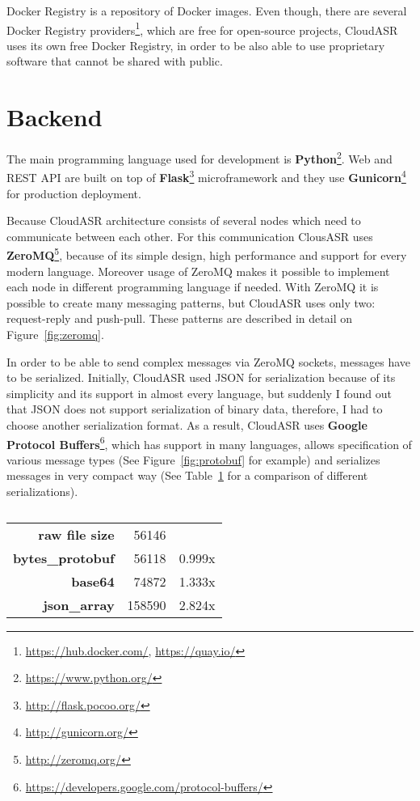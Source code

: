 Docker Registry is a repository of Docker images.
Even though, there are several Docker Registry providers\footnote{\url{https://hub.docker.com/}, \url{https://quay.io/}},
  which are free for open-source projects,
  CloudASR uses its own free Docker Registry,
  in order to be also able to use proprietary software that cannot be shared with public.


\section{Backend}
The main programming language used for development is \textbf{Python}\footnote{\url{https://www.python.org/}}.
Web and REST API are built on top of \textbf{Flask}\footnote{\url{http://flask.pocoo.org/}} microframework
  and they use \textbf{Gunicorn}\footnote{\url{http://gunicorn.org/}} for production deployment.


Because CloudASR architecture consists of several nodes which need to communicate between each other.
For this communication ClousASR uses \textbf{ZeroMQ}\footnote{\url{http://zeromq.org/}},
  because of its simple design, high performance and support for every modern language.
Moreover usage of ZeroMQ makes it possible to implement each node in different programming language if needed.
With ZeroMQ it is possible to create many messaging patterns,
  but CloudASR uses only two: request-reply and push-pull.
These patterns are described in detail on Figure~\ref{fig:zeromq}.


In order to be able to send complex messages via ZeroMQ sockets, messages have to be serialized.
Initially, CloudASR used JSON for serialization because of its simplicity and its support in almost every language,
  but suddenly I found out that JSON does not support serialization of binary data,
  therefore, I had to choose another serialization format.
As a result, CloudASR uses \textbf{Google Protocol Buffers}\footnote{\url{https://developers.google.com/protocol-buffers/}},
  which has support in many languages,
  allows specification of various message types (See Figure~\ref{fig:protobuf} for example)
  and serializes messages in very compact way
  (See Table~\ref{fig:protobuf-benchmark} for a comparison of different serializations).

\begin{table}[h]
  \begin{tabular}{rrl}
  \textbf{raw file size} & 56146 & \\
  \cline{1-3}
  \textbf{bytes\_protobuf} & 56118 & 0.999x \\
  \textbf{base64} & 74872 & 1.333x \\
  \textbf{json\_array} & 158590 & 2.824x \\
  \end{tabular}

  \label{fig:protobuf-benchmark}
  \caption{}
\end{table}

